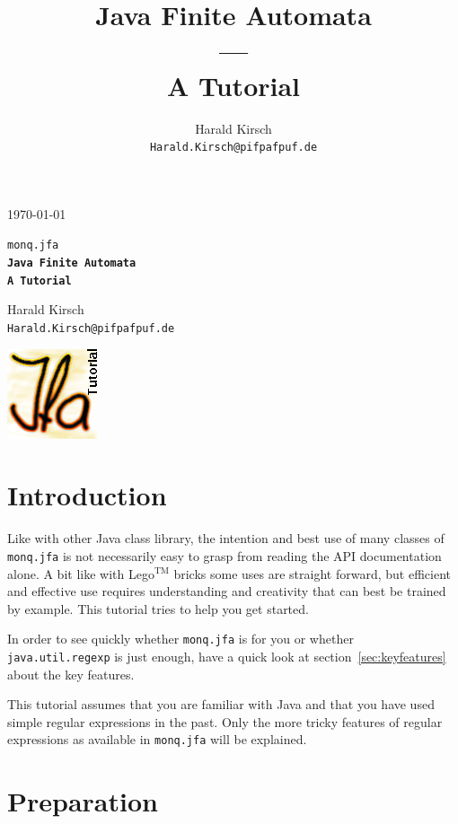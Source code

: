 \documentclass[12pt,a4paper,halfparskip]{scrartcl}
\title{Java Finite Automata\\---\\A Tutorial}
\author{Harald Kirsch\\\texttt{\small Harald.Kirsch@pifpafpuf.de}}
\newcommand{\monqjfa}{\texttt{monq.jfa}\xspace}
\begin{document}
\begin{titlepage}
  {\tiny \today}
  \vfill
  \begin{raggedleft}
   \Huge\tt monq.jfa\\
   \bf\sf Java Finite Automata\\
   A Tutorial\\
   \strut
  \end{raggedleft}

  \begin{raggedleft}
    \large
  Harald Kirsch\\
  \texttt{\small Harald.Kirsch@pifpafpuf.de}\\
  \strut
  \end{raggedleft}
  \vfill
  \includegraphics{JfaLogo.png}\vspace*{-2cm}
\end{titlepage}
\newpage
\tableofcontents



\section{Introduction}
Like with other Java class library, the intention and best use of
many classes of \texttt{monq.jfa} is not necessarily easy to grasp
from reading the API documentation alone.
A bit like with Lego$^{\text{TM}}$ bricks some uses are straight
forward, but efficient and effective use requires understanding and
creativity that can best be trained by example. This tutorial tries to
help you get started.

In order to see quickly whether \monqjfa is for you or whether
\texttt{java.util.regexp} is just enough, have a quick look at
section~\ref{sec:keyfeatures} about the key features.

This tutorial assumes that you are familiar with Java and that you
have used simple regular expressions in the past. Only the more tricky
features of regular expressions as available in \monqjfa will be
explained.



\section{Preparation}
\end{document}
